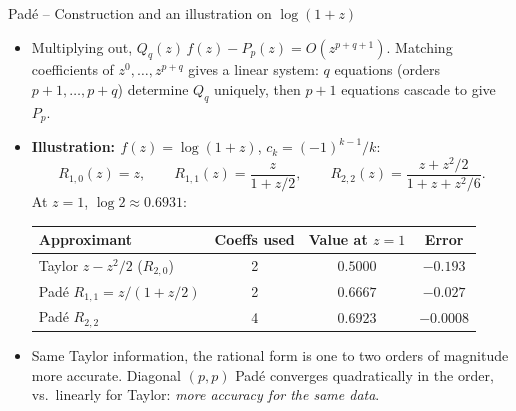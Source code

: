 \documentclass[11pt,aspectratio=169]{beamer}
\begin{document}
\begin{frame}{Padé -- Construction and an illustration on $\log(1+z)$}

\begin{itemize}

\item Multiplying out, $Q_q(z)\,f(z) - P_p(z) = O(z^{p+q+1})$.
  Matching coefficients of $z^0,\ldots,z^{p+q}$ gives a linear
  system: $q$ equations (orders $p{+}1,\ldots,p{+}q$) determine $Q_q$
  uniquely, then $p{+}1$ equations cascade to give $P_p$.\newline

\item \textbf{Illustration: $f(z) = \log(1+z)$}, $c_k = (-1)^{k-1}/k$:
  \[
  R_{1,0}(z) = z,
  \qquad
  R_{1,1}(z) = \frac{z}{1+z/2},
  \qquad
  R_{2,2}(z) = \frac{z + z^2/2}{1 + z + z^2/6}.
  \]
  At $z=1$, $\log 2 \approx 0.6931$:
  \begin{center}
    \scriptsize
    \renewcommand{\arraystretch}{1.25}
    \begin{tabular}{lccc}
      \toprule
      Approximant & Coeffs used & Value at $z=1$ & Error \\
      \midrule
      Taylor $z - z^2/2$ ($R_{2,0}$) & 2 & $0.5000$ & $-0.193$ \\
      Padé $R_{1,1} = z/(1+z/2)$  & 2 & $0.6667$ & $-0.027$ \\
      Padé $R_{2,2}$              & 4 & $0.6923$ & $-0.0008$ \\
      \bottomrule
    \end{tabular}
  \end{center}

\item Same Taylor information, the rational form is one to two orders
  of magnitude more accurate. Diagonal $(p,p)$ Padé converges
  quadratically in the order, vs.\ linearly for Taylor: \emph{more
  accuracy for the same data}.

\end{itemize}

\end{frame}
\end{document}
